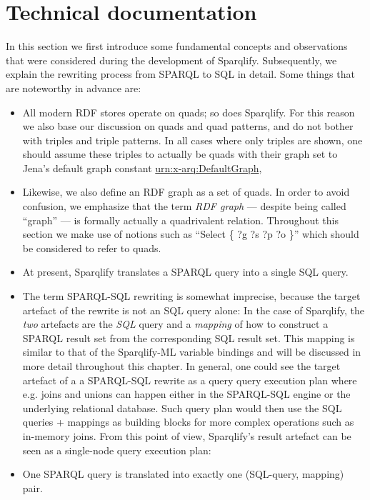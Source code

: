 \documentclass[a4paper,twoside,bibtotoc,abstracton,12pt,BCOR=15mm]{scrreprt}
\begin{document}
\chapter{Technical documentation}
\label{sec:tech-doc}
In this section we first introduce some fundamental concepts and observations that were considered during the development of Sparqlify. 
Subsequently, we explain the rewriting process from SPARQL to SQL in detail.
Some things that are noteworthy in advance are:
\begin{itemize}
  \item All modern RDF stores operate on quads; so does Sparqlify.
		For this reason we also base our discussion on quads and quad patterns, and do not bother with triples and triple patterns.
		In all cases where only triples are shown, one should assume these triples to actually be quads with their graph set to Jena's default graph constant \url{urn:x-arq:DefaultGraph}, 
  \item Likewise, we also define an RDF graph as a set of quads.
		In order to avoid confusion, we emphasize that the term \emph{RDF graph} --- despite being called ``graph'' --- is formally actually a quadrivalent relation.
        Throughout this section we make use of notions such as ``Select \{ ?g ?s ?p ?o \}'' which should be considered to refer to quads.      
  \item At present, Sparqlify translates a SPARQL query into a single SQL query.
  \item The term SPARQL-SQL rewriting is somewhat imprecise, because the target artefact of the rewrite is not an SQL query alone: In the case of Sparqlify, the \emph{two}
        artefacts are the \emph{SQL} query and a \emph{mapping} of how to construct a SPARQL result set from the corresponding SQL result set.
        This mapping is similar to that of the Sparqlify-ML variable bindings and will be discussed in more detail throughout this chapter.
        In general, one could see the target artefact of a a SPARQL-SQL rewrite as a query query execution plan where e.g. joins and unions can happen either in the SPARQL-SQL engine or the underlying relational database.
        Such query plan would then use the SQL queries + mappings as building blocks for more complex operations such as in-memory joins.
        From this point of view, Sparqlify's result artefact can be seen as a single-node query execution plan:
   \item One SPARQL query is translated into exactly one (SQL-query, mapping) pair.
\end{itemize}
\end{document}
